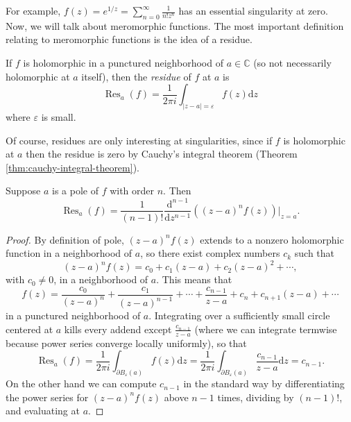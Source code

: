 \documentclass[10pt]{article}
\providecommand{\eps}{\varepsilon}
\providecommand{\dd}{\mathrm d}
\providecommand{\CC}{\mathbb C}
\providecommand{\opname}{\operatorname}
\providecommand{\res}{\opname{Res}}
\providecommand{\abs}[1]{\left\lvert{#1}\right\rvert}
\providecommand{\vocab}[1]{{{\sffamily\textit{#1}}}}
\begin{document}
For example, $f(z) = e^{1/z} = \sum_{n=0}^\infty \frac 1{n!z^n}$
has an essential singularity at zero.
\\

Now, we will talk about meromorphic functions.
The most important definition relating to meromorphic functions
is the idea of a residue.

\begin{definition}[Residue]
    \label{def:residue}
    If $f$ is holomorphic in a punctured neighborhood of $a\in\CC$
    (so not necessarily holomorphic at $a$ itself), then
    the \vocab{residue} of $f$ at $a$ is
    \begin{equation*}
	\res_a(f) = \frac 1{2\pi i}\int_{\abs{z-a} = \eps} f(z)\dd z
    \end{equation*}
    where $\eps$ is small.
\end{definition}

Of course, residues are only interesting at singularities,
since if $f$ is holomorphic at $a$ then
the residue is zero by Cauchy's integral theorem
(Theorem \ref{thm:cauchy-integral-theorem}).

\begin{prop}
    \label{prop:residue-formula}
    Suppose $a$ is a pole of $f$ with order $n$. Then
    \begin{equation*}
	\res_a(f) = \frac 1{(n-1)!}\frac{\dd^{n-1}}{\dd z^{n-1}}
	((z-a)^nf(z))\Big|_{z=a}.
    \end{equation*}
\end{prop}

\begin{proof}
    By definition of pole, $(z-a)^nf(z)$ extends to
    a nonzero holomorphic function in a neighborhood of $a$,
    so there exist complex numbers $c_k$ such that
    \begin{equation*}
	(z-a)^nf(z) = c_0 + c_1(z-a) + c_2(z-a)^2 + \cdots,
    \end{equation*}
    with $c_0\ne 0$, in a neighborhood of $a$.
    This means that
    \begin{equation*}
	f(z) = \frac{c_0}{(z-a)^n} + \frac{c_1}{(z-a)^{n-1}}
	+ \cdots + \frac{c_{n-1}}{z-a} + c_n + c_{n+1}(z-a) + \cdots
    \end{equation*}
    in a punctured neighborhood of $a$.
    Integrating over a sufficiently small circle centered at $a$
    kills every addend except $\frac{c_{n-1}}{z-a}$
    (where we can integrate termwise because
    power series converge locally uniformly), so that
    \begin{equation*}
	\res_a(f) = \frac 1{2\pi i}\int_{\partial B_\eps(a)} f(z)\dd z
	= \frac 1{2\pi i}\int_{\partial B_\eps(a)}\frac{c_{n-1}}{z-a}\dd z
	= c_{n-1}.
    \end{equation*}
    On the other hand we can compute $c_{n-1}$ in the standard way
    by differentiating the power series for $(z-a)^nf(z)$
    above $n-1$ times, dividing by $(n-1)!$, and evaluating at $a$.
\end{proof}
\end{document}
